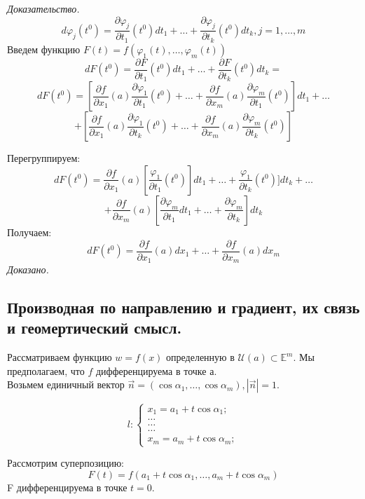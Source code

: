 \documentclass[a4paper,14pt]{article} %
\begin{document}
	 \textit{Доказательство.}
	 \[d\varphi_j(t^0) = \frac {\partial \varphi_j}{\partial t_1}(t^0)dt_1 + \ldots + \frac {\partial \varphi_j}{\partial t_k}(t^0)dt_k, j = 1, \ldots, m\]
	 Введем функцию $F(t) = f(\varphi_1(t), \ldots, \varphi_m(t))$
	 \[dF(t^0) = \frac{\partial F}{\partial t_1}(t^0)dt_1 + \ldots +\frac{\partial F}{\partial t_k}(t^0)dt_k = \]
	 \[dF(t^0) = [\frac{\partial f}{\partial x_1}(a) \frac{\partial \varphi_1}{\partial t_1}(t^0) + \ldots + \frac{\partial f}{\partial x_m}(a) \frac{\partial \varphi_m}{\partial t_1}(t^0)]dt_1 + \ldots\]
	 \[+[\frac{\partial f}{\partial x_1}(a) \frac{\partial \varphi_1}{\partial t_k}(t^0) + \ldots + \frac{\partial f}{\partial x_m}(a) \frac{\partial \varphi_m}{\partial t_k}(t^0)]\]
	 
	 Перегруппируем:
	 \[dF(t^0) = \frac{\partial f}{\partial x_1}(a)[\frac{\varphi_1}{\partial t_1}(t^0)]dt_1 + \ldots + \frac{\varphi_1}{\partial t_k}(t^0)]dt_k + \ldots\] \[+\frac{\partial f}{\partial x_m}(a)[\frac{\partial \varphi_m}{\partial t_1}dt_1 + \ldots + \frac{\partial \varphi_m}{\partial t_k}]dt_k\]
	 Получаем:
	 \[dF(t^0) = \frac{\partial f}{\partial x_1}(a)dx_1 + \ldots + \frac{\partial f}{\partial x_m}(a)dx_m\]
	 \textit{Доказано.}
	 
	 \subsection*{Производная по направлению и градиент, их связь и  геомертический смысл.}
	 Рассматриваем функцию $w = f(x)$ определенную в $\mathscr{U}(a) \subset \mathds{E}^m$. Мы предполагаем, что $f$ дифференцируема в точке а.\\
	 Возьмем единичный вектор $\vec{n} = (\cos \alpha_1, \ldots, \cos \alpha_m), |\vec{n}| = 1$.
	 
	 \begin{equation*}
	 	l: 
	 	\begin{cases}
	 		x_1 = a_1 + t\cos \alpha_1;\\
	 		\ldots\\
	 		\ldots\\
	 		\ldots\\
	 		x_m = a_m + t\cos \alpha_m;
	 	\end{cases}
	 \end{equation*}
	 
	 Рассмотрим суперпозицию:
	 \[F(t) = f(a_1 + t\cos\alpha_1, \ldots, a_m + t\cos\alpha_m)\]
	 F дифференцируема в точке $t = 0$.\\
	 
\end{document}
